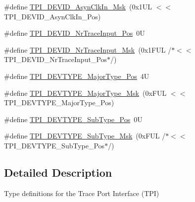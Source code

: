 \begin{DoxyCompactItemize}
\item 
\#define \hyperlink{group___c_m_s_i_s___t_p_i_gab67830557d2d10be882284275025a2d3}{T\-P\-I\-\_\-\-D\-E\-V\-I\-D\-\_\-\-Asyn\-Clk\-In\-\_\-\-Msk}~(0x1\-U\-L $<$$<$ T\-P\-I\-\_\-\-D\-E\-V\-I\-D\-\_\-\-Asyn\-Clk\-In\-\_\-\-Pos)
\item 
\#define \hyperlink{group___c_m_s_i_s___t_p_i_ga80ecae7fec479e80e583f545996868ed}{T\-P\-I\-\_\-\-D\-E\-V\-I\-D\-\_\-\-Nr\-Trace\-Input\-\_\-\-Pos}~0\-U
\item 
\#define \hyperlink{group___c_m_s_i_s___t_p_i_gabed454418d2140043cd65ec899abd97f}{T\-P\-I\-\_\-\-D\-E\-V\-I\-D\-\_\-\-Nr\-Trace\-Input\-\_\-\-Msk}~(0x1\-F\-U\-L /$\ast$$<$$<$ T\-P\-I\-\_\-\-D\-E\-V\-I\-D\-\_\-\-Nr\-Trace\-Input\-\_\-\-Pos$\ast$/)
\item 
\#define \hyperlink{group___c_m_s_i_s___t_p_i_ga69c4892d332755a9f64c1680497cebdd}{T\-P\-I\-\_\-\-D\-E\-V\-T\-Y\-P\-E\-\_\-\-Major\-Type\-\_\-\-Pos}~4\-U
\item 
\#define \hyperlink{group___c_m_s_i_s___t_p_i_gaecbceed6d08ec586403b37ad47b38c88}{T\-P\-I\-\_\-\-D\-E\-V\-T\-Y\-P\-E\-\_\-\-Major\-Type\-\_\-\-Msk}~(0x\-F\-U\-L $<$$<$ T\-P\-I\-\_\-\-D\-E\-V\-T\-Y\-P\-E\-\_\-\-Major\-Type\-\_\-\-Pos)
\item 
\#define \hyperlink{group___c_m_s_i_s___t_p_i_ga0c799ff892af5eb3162d152abc00af7a}{T\-P\-I\-\_\-\-D\-E\-V\-T\-Y\-P\-E\-\_\-\-Sub\-Type\-\_\-\-Pos}~0\-U
\item 
\#define \hyperlink{group___c_m_s_i_s___t_p_i_ga5b2fd7dddaf5f64855d9c0696acd65c1}{T\-P\-I\-\_\-\-D\-E\-V\-T\-Y\-P\-E\-\_\-\-Sub\-Type\-\_\-\-Msk}~(0x\-F\-U\-L /$\ast$$<$$<$ T\-P\-I\-\_\-\-D\-E\-V\-T\-Y\-P\-E\-\_\-\-Sub\-Type\-\_\-\-Pos$\ast$/)
\end{DoxyCompactItemize}


\subsection{Detailed Description}
Type definitions for the Trace Port Interface (T\-P\-I) 


